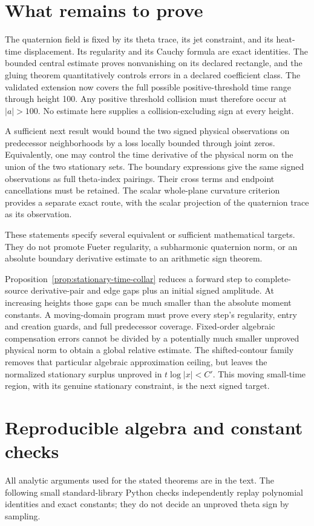 \documentclass[11pt]{article}
\numberwithin{equation}{section}
\theoremstyle{definition}
\theoremstyle{remark}
\begin{document}
\section{What remains to prove}\label{sec:remaining}
The quaternion field is fixed by its theta trace, its jet constraint, and
its heat-time displacement. Its regularity and its Cauchy formula are
exact identities. The bounded central estimate proves nonvanishing on
its declared rectangle, and the gluing theorem quantitatively controls
errors in a declared coefficient class. The validated extension now
covers the full possible positive-threshold time range through height
100. Any positive threshold collision must therefore occur at \(|a|>100\).
No estimate here supplies a collision-excluding sign at every height.

A sufficient next result would bound the two signed physical observations
on predecessor neighborhoods by a loss locally bounded through joint
zeros. Equivalently, one may control the time derivative of the physical
norm on the union of the two stationary sets. The boundary expressions
give the same signed observations as full theta-index pairings. Their
cross terms and endpoint cancellations must be retained. The scalar
whole-plane curvature criterion provides a separate exact route, with
the scalar projection of the quaternion trace as its observation.

These statements specify several equivalent or sufficient mathematical
targets. They do not promote Fueter regularity, a subharmonic quaternion
norm, or an absolute boundary derivative estimate to an arithmetic sign
theorem.

Proposition~\ref{prop:stationary-time-collar} reduces a forward step
to complete-source derivative-pair and edge gaps plus an initial signed
amplitude. At increasing heights those gaps can be much smaller than
the absolute moment constants. A moving-domain program must prove every
step's regularity, entry and creation guards, and full predecessor
coverage. Fixed-order algebraic compensation errors cannot be divided
by a potentially much smaller unproved physical norm to obtain a global
relative estimate. The shifted-contour family removes that particular
algebraic approximation ceiling, but leaves the normalized stationary
surplus unproved in \(t\log|x|<C'\). This moving small-time region,
with its genuine stationary constraint, is the next signed target.

\appendix
\section{Reproducible algebra and constant checks}\label{app:checks}
All analytic arguments used for the stated theorems are in the text.
The following small standard-library Python checks independently replay
polynomial identities and exact constants; they do not decide an
unproved theta sign by sampling.
\end{document}
